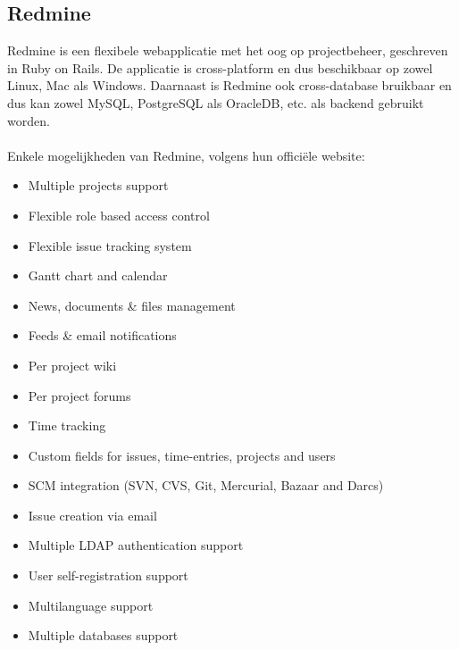\subsection{Redmine}
Redmine is een flexibele webapplicatie met het oog op projectbeheer, geschreven in Ruby on Rails. De applicatie is cross-platform en dus beschikbaar op zowel Linux, Mac als Windows. Daarnaast is Redmine ook cross-database bruikbaar en dus kan zowel MySQL, PostgreSQL als OracleDB, etc. als backend gebruikt worden.\\\\
%
Enkele mogelijkheden van Redmine, volgens hun offici\"ele website:
\begin{itemize}
    \item Multiple projects support
    \item Flexible role based access control
    \item Flexible issue tracking system
    \item Gantt chart and calendar
    \item News, documents \& files management
    \item Feeds \& email notifications
    \item Per project wiki
    \item Per project forums
    \item Time tracking
    \item Custom fields for issues, time-entries, projects and users
    \item SCM integration (SVN, CVS, Git, Mercurial, Bazaar and Darcs)
    \item Issue creation via email
    \item Multiple LDAP authentication support
    \item User self-registration support
    \item Multilanguage support
    \item Multiple databases support
\end{itemize}

